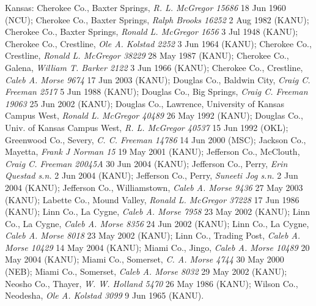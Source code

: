\documentclass{article}
\begin{document}
Kansas:
Cherokee Co., Baxter Springs, \textit{R. L. McGregor 15686} 18 Jun 1960 (NCU);
Cherokee Co., Baxter Springs, \textit{Ralph Brooks 16252} 2 Aug 1982 (KANU);
Cherokee Co., Baxter Springs, \textit{Ronald L. McGregor 1656} 3 Jul 1948 (KANU);
Cherokee Co., Crestline, \textit{Ole A. Kolstad 2252} 3 Jun 1964 (KANU);
Cherokee Co., Crestline, \textit{Ronald L. McGregor 38229} 28 May 1987 (KANU);
Cherokee Co., Galena, \textit{William T. Barker 2122} 3 Jun 1966 (KANU);
Cherokee Co., Crestline, \textit{Caleb A. Morse 9674} 17 Jun 2003 (KANU);
Douglas Co., Baldwin City, \textit{Craig C. Freeman 2517} 5 Jun 1988 (KANU);
Douglas Co., Big Springs, \textit{Craig C. Freeman 19063} 25 Jun 2002 (KANU);
Douglas Co., Lawrence, University of Kansas Campus West, \textit{Ronald L. McGregor 40489} 26 May 1992 (KANU);
Douglas Co., Univ. of Kansas Campus West, \textit{R. L. McGregor 40537} 15 Jun 1992 (OKL);
Greenwood Co., Severy, \textit{C. C. Freeman 14786} 14 Jun 2000 (MSC);
Jackson Co., Mayetta, \textit{Frank J Norman 15} 19 May 2001 (KANU);
Jefferson Co., McClouth, \textit{Craig C. Freeman 20045A} 30 Jun 2004 (KANU);
Jefferson Co., Perry, \textit{Erin Questad s.n.} 2 Jun 2004 (KANU);
Jefferson Co., Perry, \textit{Suneeti Jog s.n.} 2 Jun 2004 (KANU);
Jefferson Co., Williamstown, \textit{Caleb A. Morse 9436} 27 May 2003 (KANU);
Labette Co., Mound Valley, \textit{Ronald L. McGregor 37228} 17 Jun 1986 (KANU);
Linn Co., La Cygne, \textit{Caleb A. Morse 7958} 23 May 2002 (KANU);
Linn Co., La Cygne, \textit{Caleb A. Morse 8356} 24 Jun 2002 (KANU);
Linn Co., La Cygne, \textit{Caleb A. Morse 8018} 23 May 2002 (KANU);
Linn Co., Trading Post, \textit{Caleb A. Morse 10429} 14 May 2004 (KANU);
Miami Co., Jingo, \textit{Caleb A. Morse 10489} 20 May 2004 (KANU);
Miami Co., Somerset, \textit{C. A. Morse 4744} 30 May 2000 (NEB);
Miami Co., Somerset, \textit{Caleb A. Morse 8032} 29 May 2002 (KANU);
Neosho Co., Thayer, \textit{W. W. Holland 5470} 26 May 1986 (KANU);
Wilson Co., Neodesha, \textit{Ole A. Kolstad 3099} 9 Jun 1965 (KANU).
\end{document}

